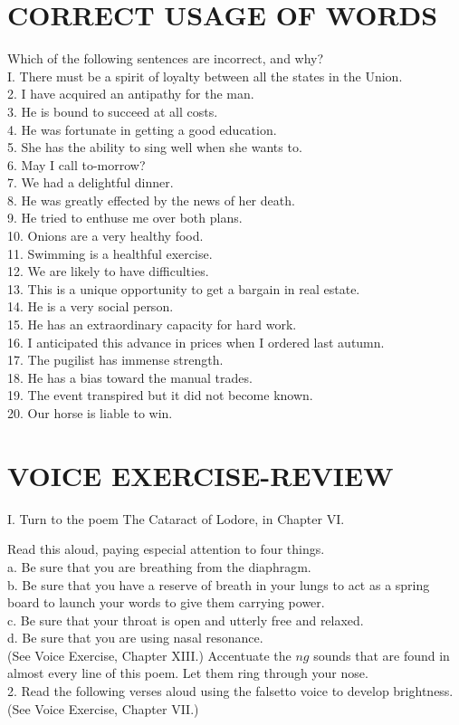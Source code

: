 \documentclass[10pt]{article}
\begin{document}
\section*{CORRECT USAGE OF WORDS}
Which of the following sentences are incorrect, and why?\\
I. There must be a spirit of loyalty between all the states in the Union.\\
2. I have acquired an antipathy for the man.\\
3. He is bound to succeed at all costs.\\
4. He was fortunate in getting a good education.\\
5. She has the ability to sing well when she wants to.\\
6. May I call to-morrow?\\
7. We had a delightful dinner.\\
8. He was greatly effected by the news of her death.\\
9. He tried to enthuse me over both plans.\\
10. Onions are a very healthy food.\\
11. Swimming is a healthful exercise.\\
12. We are likely to have difficulties.\\
13. This is a unique opportunity to get a bargain in real estate.\\
14. He is a very social person.\\
15. He has an extraordinary capacity for hard work.\\
16. I anticipated this advance in prices when I ordered last autumn.\\
17. The pugilist has immense strength.\\
18. He has a bias toward the manual trades.\\
19. The event transpired but it did not become known.\\
20. Our horse is liable to win.

\section*{VOICE EXERCISE-REVIEW}
I. Turn to the poem The Cataract of Lodore, in Chapter VI.

Read this aloud, paying especial attention to four things.\\
a. Be sure that you are breathing from the diaphragm.\\
b. Be sure that you have a reserve of breath in your lungs to act as a spring board to launch your words to give them carrying power.\\
c. Be sure that your throat is open and utterly free and relaxed.\\
d. Be sure that you are using nasal resonance.\\
(See Voice Exercise, Chapter XIII.) Accentuate the $n g$ sounds that are found in almost every line of this poem. Let them ring through your nose.\\
2. Read the following verses aloud using the falsetto voice to develop brightness. (See Voice Exercise, Chapter VII.)
\end{document}
